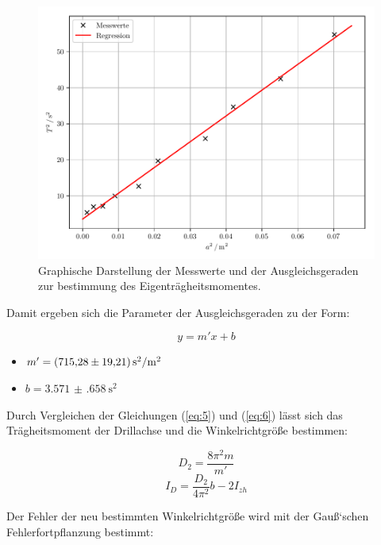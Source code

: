\begin{figure}[H]
  \centering
  \includegraphics[width=\textwidth]{ausgleichsgerade1.pdf}
  \caption{Graphische Darstellung der Messwerte und der Ausgleichsgeraden zur bestimmung
  des Eigenträgheitsmomentes.}
  \label{fig:Abb4}
\end{figure}

Damit ergeben sich die Parameter der Ausgleichsgeraden zu der Form:

\begin{equation}
  y = m'x + b
  \label{eq:7}
\end{equation}

\begin{itemize}
  \item $m' = \SI{715.28(1921)}{\second\squared\per{\meter\squared}}$
  \item $b = \SI{3.571(658)}{\second\squared}$
\end{itemize}

Durch Vergleichen der Gleichungen (\ref{eq:5}) und (\ref{eq:6}) lässt sich das Trägheitsmoment der
Drillachse und die Winkelrichtgröße bestimmen:

\begin{equation}
  D_2 = \frac{8\pi^2m}{m'}
  \label{eq:8}
\end{equation}
\begin{equation}
  I_D = \frac{D_2}{4\pi^2}b - 2I_{zh}
  \label{eq:9}
\end{equation}

Der Fehler der neu bestimmten Winkelrichtgröße wird mit der Gauß`schen Fehlerfortpflanzung
bestimmt:\\\\


